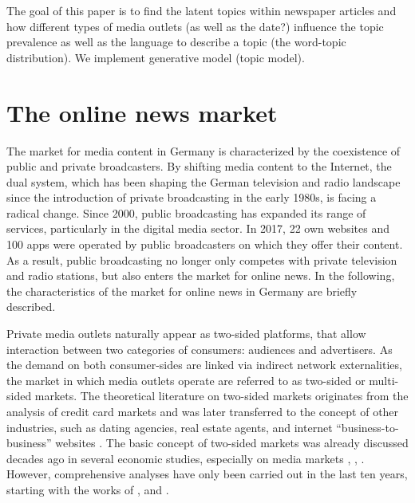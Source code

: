 \documentclass[12pt,a4paper,notitlepage]{article}
\begin{document}
The goal of this paper is to find the latent topics within newspaper articles and how different types of media outlets (as well as the date?) influence the topic prevalence as well as the language to describe a topic (the word-topic distribution). We implement generative model (topic model). 

\section{The online news market}\label{ch_onlinenews}

The market for media content in Germany is characterized by the coexistence of public and private broadcasters. By shifting media content to the Internet, the dual system, which has been shaping the German television and radio landscape since the introduction of private broadcasting in the early 1980s, is facing a radical change. Since 2000, public broadcasting has expanded its range of services, particularly in the digital media sector. In 2017, 22 own websites and 100 apps were operated by public broadcasters on which they offer their content. As a result, public broadcasting no longer only competes with private television and radio stations, but also enters the market for online news. In the following, the characteristics of the market for online news in Germany are briefly described. 

Private media outlets naturally appear as two-sided platforms, that allow interaction between two categories of consumers: audiences and advertisers. As the demand on both consumer-sides are linked via indirect network externalities, the market in which media outlets operate are referred to as two-sided or multi-sided markets. The theoretical literature on two-sided markets originates from the analysis of credit card markets \citep{rochet_platform_2003} and was later transferred to the concept of other industries, such as dating agencies, real estate agents, and internet “business-to-business” websites \citep{caillaud_chicken_2003}. The basic concept of two-sided markets was already discussed decades ago in several economic studies, especially on media markets \citep{corden_maximisation_1952}, \citep{gustafsson_circulation_1978}, \citep{blair_pricing_1993}. However, comprehensive analyses have only been carried out in the last ten years, starting with the works of \citet{rochet_platform_2003}, \citet{evans_empirical_2003} and \citet{armstrong_competition_2006}.
\end{document}
